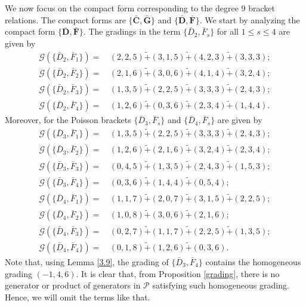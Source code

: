 \documentclass[10pt]{amsart}
\theoremstyle{definition}
\theoremstyle{corollary}
\theoremstyle{remark}
\theoremstyle{conclusion}
\begin{document}
We now focus on the compact form corresponding to the degree $9$ bracket relations. The compact forms are $\{\bar{\textbf{C}},\bar{\textbf{G}}\}$ and $\{\bar{\textbf{D}},\bar{\textbf{F}}\}$. We start by analyzing the compact form $\{\bar{\textbf{D}},\bar{\textbf{F}}\}$.  The gradings in the term $\{\bar{D}_2,\bar{F}_s\}$ for all $1 \leq s \leq 4$ are given by \begin{align}
    \mathcal{G}\left(\{\bar{D}_2,\bar{F}_1\}\right) = & \, (2,2,5) \tilde{+} (3,1,5) \tilde{+} (4,2,3) \tilde{+}(3,3,3) ; \nonumber\\
     \mathcal{G}\left(\{\bar{D}_2,\bar{F}_2\}\right) = & \, (2,1,6) \tilde{+} (3,0,6) \tilde{+} (4,1,4) \tilde{+}(3,2,4) ;  \nonumber\\
     \mathcal{G}\left(\{\bar{D}_2,\bar{F}_3\}\right) = & \, (1,3,5) \tilde{+} (2,2,5) \tilde{+} (3,3,3) \tilde{+}(2,4,3) ;  \nonumber\\ 
      \mathcal{G}\left(\{\bar{D}_2,\bar{F}_4\}\right) = & \, (1,2,6) \tilde{+} (0,3,6) \tilde{+} (2,3,4) \tilde{+}(1,4,4).
      \end{align} Moreover, for the Poisson brackets $\{\bar{D}_3,\bar{F}_s\}$ and $\{\bar{D}_4,\bar{F}_s\}$ are given by
      \begin{align}
         \mathcal{G}\left(\{\bar{D}_3,\bar{F}_1\}\right) = & \, (1,3,5) \tilde{+} (2,2,5) \tilde{+} (3,3,3) \tilde{+}(2,4,3) ;  \nonumber \\
          \mathcal{G}\left(\{\bar{D}_3,\bar{F}_2\}\right) = & \, (1,2,6) \tilde{+} (2,1,6) \tilde{+} (3,2,4) \tilde{+}(2,3,4) ;  \nonumber \\
             \mathcal{G}\left(\{\bar{D}_3,\bar{F}_3\}\right) = & \, (0,4,5) \tilde{+} (1,3,5) \tilde{+} (2,4,3) \tilde{+}(1,5,3) ;  \nonumber\\
           \mathcal{G}\left(\{\bar{D}_3,\bar{F}_4\}\right) = & \,   (0,3,6) \tilde{+} (1,4,4) \tilde{+}(0,5,4);  \nonumber \\
       \mathcal{G}\left(\{\bar{D}_4,\bar{F}_1\}\right) = & \, (1,1,7) \tilde{+} (2,0,7) \tilde{+} (3,1,5) \tilde{+}(2,2,5) ;  \nonumber \\
          \mathcal{G}\left(\{\bar{D}_4,\bar{F}_2\}\right) = & \, (1,0,8) \tilde{+}   (3,0,6) \tilde{+}(2,1,6) ; \nonumber \\
             \mathcal{G}\left(\{\bar{D}_4,\bar{F}_3\}\right) = & \, (0,2,7) \tilde{+} (1,1,7) \tilde{+} (2,2,5) \tilde{+}(1,3,5) ;  \nonumber\\
           \mathcal{G}\left(\{\bar{D}_4,\bar{F}_4\}\right) = & \,   (0,1,8) \tilde{+} (1,2,6) \tilde{+}(0,3,6).      \label{eq:4.41}
\end{align} Note that, using Lemma \ref{3.9}, the grading of $\{\bar{D}_3,\bar{F}_4\}$ contains the homogeneous grading $(-1,4,6)$. It is clear that, from Proposition \ref{grading}, there is no generator or product of generators in $\mathcal{P}$ satisfying such homogeneous grading. Hence, we will omit the terms like that. 
\end{document}
